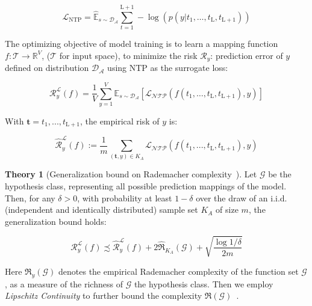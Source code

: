 \vspace{-1em}
\begin{small}
\begin{equation}
\mathcal{L}_\mathrm{NTP} = \hat{\mathbb{E}}_{{s} \sim \mathcal{D_A}} \sum_{t=1}^{\text{L}+1} -\log \left( p(y | {t}_1, \dots, {t}_\text{L}, {t}_{\text{L}+1}) \right)
\end{equation}
\end{small}  
The optimizing objective of model training is to learn a mapping function $f: \mathcal{T}\rightarrow\mathbb{R}^{V}$, ($\mathcal{T}$ for input space), to minimize the risk  $\mathcal{R}_{y}$: prediction error of $y$ defined on distribution $\mathcal{D_A}$ using NTP as the surrogate loss:
\vspace{-0.5em}
\begin{small}
\begin{equation}
\mathcal{R}_{y}^{\mathcal{L}}(f)=\frac{1}{V} \sum_{y=1}^{V} \mathbb{E}_{s \sim \mathcal{D_A}} \left[ \mathcal{L_{\text{NTP}}}\left(f(t_1, \dots, t_\text{L}, t_{\text{L}+1}), y\right) \right]
\end{equation}
\end{small}
With $\boldsymbol{t}=t_1, ..., t_{\text{L}+1}$, the empirical risk of $y$ is:
\begin{small}
\begin{equation}
\widehat{\mathcal{R}}^{\mathcal{L}}_y(f) := \frac{1}{m} \sum_{(\boldsymbol{t},y) \in K_A} \mathcal{L_{\text{NTP}}}(f(t_1, ..., t_\text{L}, t_{\text{L}+1}), y)
\end{equation} 
\end{small}
\textbf{Theory 1} (Generalization bound on Rademacher complexity~\cite{mohri2018foundations}).
Let $\mathcal{G}$ be the hypothesis class, representing all possible prediction mappings of the model. Then, for any $\delta > 0 $, with probability at least $1 - \delta$ over the draw of an i.i.d. (independent and identically distributed) sample set $K_A$ of size $m$, 
the generalization bound holds:
\vspace{-0.5em}
\begin{small}
\begin{equation}
\label{eq.initial_bound}
\mathcal{R}^{\mathcal{L}}_y(f) \precsim \widehat{\mathcal{R}}^{\mathcal{L}}_y(f) + 2\widehat{\Re}_{K_A}(\mathcal{G}) + \sqrt{\frac{\log 1/\delta}{2m}} 
\end{equation}
\end{small}
Here ${\Re}_y(\mathcal{G})$ denotes the empirical Rademacher complexity of the function set $\mathcal{G}$, as a measure of the richness of $\mathcal{G}$ the hypothesis class. Then we employ \textit{Lipschitz Continuity} to further bound the complexity ${\Re}(\mathcal{G})$~\cite{cao2019learning}.

